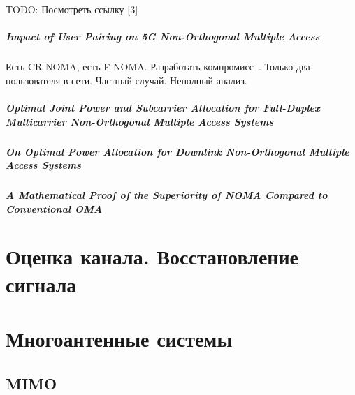 \documentclass{book}
\numberwithin{theorem}{chapter}
\numberwithin{statement}{chapter}
\numberwithin{lemma}{chapter}
\theoremstyle{definition}
\numberwithin{task}{chapter}
\theoremstyle{remark}
\numberwithin{example}{chapter}
\theoremstyle{definition}
\numberwithin{definition}{chapter}
\theoremstyle{remark}
\theoremstyle{remark}
\numberwithin{lyrics}{section}
\begin{document}
TODO: Посмотреть ссылку [3]

\paragraph{Impact of User Pairing on 5G Non-Orthogonal Multiple Access~\cite{ding2014impact}}
Есть CR-NOMA, есть F-NOMA. Разработать компромисс~\cite{ding2014impact}. Только два пользователя в сети. Частный случай. Неполный анализ.

\paragraph{Optimal Joint Power and Subcarrier Allocation for Full-Duplex Multicarrier Non-Orthogonal Multiple Access Systems~\cite{sum2017optimal}}

\paragraph{On Optimal Power Allocation for Downlink Non-Orthogonal Multiple Access Systems~\cite{zhu2017optimal}}

\paragraph{A Mathematical Proof of the Superiority of NOMA Compared to Conventional OMA~\cite{ding2016mathematical}}

\cite{dohler2017fundamential}

\chapter{Оценка канала. Восстановление сигнала}

\chapter{Многоантенные системы}

\section{MIMO}





\end{document}
